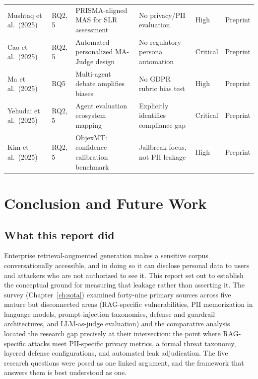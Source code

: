 \documentclass[12pt,a4paper]{report}
\begin{document}
\begin{small}
\begin{longtable}{W{2.4cm}C{0.8cm}W{3.0cm}W{2.9cm}C{1.0cm}C{1.25cm}}
Mushtaq et al.\ (2025) & RQ2, 5 & PRISMA-aligned MAS for SLR assessment & No privacy/PII evaluation & High & Preprint \\
Cao et al.\ (2025) & RQ2, 5 & Automated personalized MA-Judge design & No regulatory persona automation & Critical & Preprint \\

Ma et al.\ (2025) & RQ5 & Multi-agent debate amplifies biases & No GDPR rubric bias test & High & Preprint \\
Yehudai et al.\ (2025) & RQ2, 5 & Agent evaluation ecosystem mapping & Explicitly identifies compliance gap & Critical & Preprint \\

Kim et al.\ (2025) & RQ2, 5 & ObjexMT: confidence calibration benchmark & Jailbreak focus, not PII leakage & High & Preprint \\

\end{longtable}
\end{small}


\chapter{Conclusion and Future Work}
\label{ch:conclusion}

\section{What this report did}
\label{sec:concl-summary}

Enterprise retrieval-augmented generation makes a sensitive corpus conversationally accessible,
and in doing so it can disclose personal data to users and attackers who are not authorized to
see it. This report set out to establish the conceptual ground for measuring that leakage rather
than asserting it. The survey (Chapter~\ref{ch:sota}) examined forty-nine primary sources across
five mature but disconnected areas (RAG-specific vulnerabilities, PII memorization in language
models, prompt-injection taxonomies, defense and guardrail architectures, and LLM-as-judge
evaluation) and the comparative analysis located the research gap precisely at their
intersection: the point where RAG-specific attacks meet PII-specific privacy metrics, a formal
threat taxonomy, layered defense configurations, and automated leak adjudication. The five
research questions were posed as one linked argument, and the framework that answers them is best
understood as one.
\end{document}
